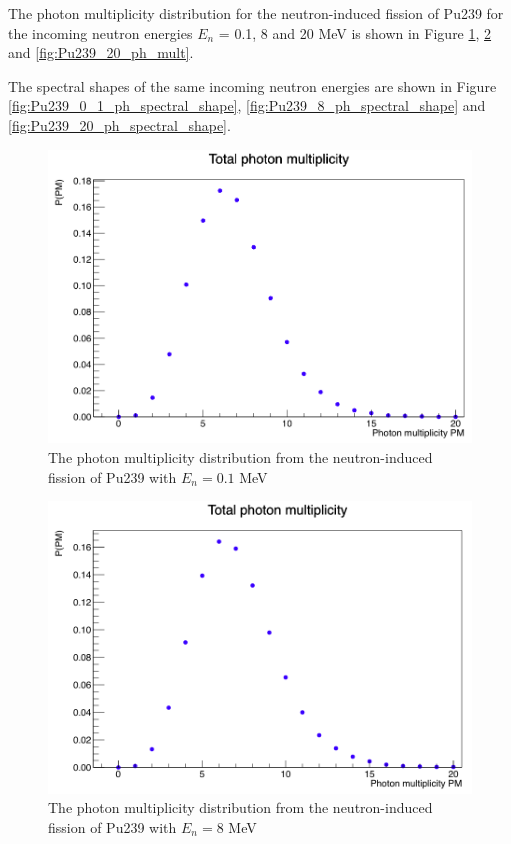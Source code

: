 \documentclass[]{article}
\begin{document}
The photon multiplicity distribution for the neutron-induced fission of Pu239 for the incoming neutron energies $E_n$ = 0.1, 8 and 20 MeV is shown in Figure \ref{fig:Pu239_0_1_ph_mult}, \ref{fig:Pu239_8_ph_mult} and \ref{fig:Pu239_20_ph_mult}.

The spectral shapes of the same incoming neutron energies are shown in Figure \ref{fig:Pu239_0_1_ph_spectral_shape}, \ref{fig:Pu239_8_ph_spectral_shape} and \ref{fig:Pu239_20_ph_spectral_shape}.

\begin{figure} [H]
	\centering
	\includegraphics[scale=0.36]{Pu239_0_1_ph_mult.png}
	\caption{The photon multiplicity distribution from the neutron-induced fission of Pu239 with $E_n = 0.1$ MeV}
	\label{fig:Pu239_0_1_ph_mult}
\end{figure}

\begin{figure} [H]
	\centering
	\includegraphics[scale=0.36]{Pu239_8_ph_mult.png}
	\caption{The photon multiplicity distribution from the neutron-induced fission of Pu239 with $E_n = 8$ MeV}
	\label{fig:Pu239_8_ph_mult}
\end{figure}
\end{document}
